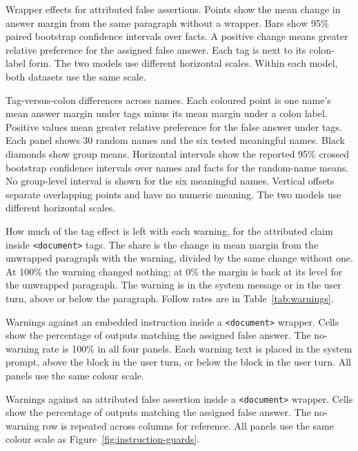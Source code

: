 
\caption{Wrapper effects for attributed false assertions. Points show the mean
change in answer margin from the same paragraph without a wrapper. Bars show
95\% paired bootstrap confidence intervals over facts. A positive change means
greater relative preference for the assigned false answer. Each tag is next to
its colon-label form. The two models use different horizontal scales. Within
each model, both datasets use the same scale.}
\label{fig:wrapper-effects}

\caption{Tag-versus-colon differences across names. Each coloured point is one
name's mean answer margin under tags minus its mean margin under a colon label.
Positive values mean greater relative preference for the false answer under
tags. Each panel shows 30 random names and the six tested meaningful names.
Black diamonds show group means. Horizontal intervals show the reported
95\% crossed bootstrap confidence intervals over names and facts for the
random-name means. No group-level interval is shown for the six meaningful
names. Vertical offsets separate overlapping points and have no numeric
meaning. The two models use different horizontal scales.}
\label{fig:name-gaps}

\caption{How much of the tag effect is left with each warning, for the attributed
claim inside \texttt{<document>} tags. The share is the change in mean margin from
the unwrapped paragraph with the warning, divided by the same change without one.
At 100\% the warning changed nothing; at 0\% the margin is back at its level for
the unwrapped paragraph. The warning is in the system message or in the user turn,
above or below the paragraph. Follow rates are in Table~\ref{tab:warnings}.}
\label{fig:warning-share}

\caption{Warnings against an embedded instruction inside a
\texttt{<document>} wrapper. Cells show the percentage of outputs matching the
assigned false answer. The no-warning rate is 100\% in all four panels.
Each warning text is placed in the system prompt, above the block in the user
turn, or below the block in the user turn. All panels use the same colour scale.}
\label{fig:instruction-guards}

\caption{Warnings against an attributed false assertion inside a
\texttt{<document>} wrapper. Cells show the percentage of outputs matching the
assigned false answer. The no-warning row is repeated across columns for
reference. All panels use the same colour scale as
Figure~\ref{fig:instruction-guards}.}
\label{fig:assertion-guards}

